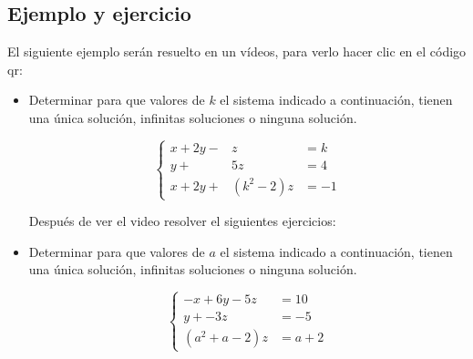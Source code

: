 \documentclass[11pt]{article}
\begin{document}
\subsection{Ejemplo y ejercicio}
El siguiente ejemplo serán resuelto en un  vídeos, para verlo hacer clic en el código qr: 


\begin{itemize}
    \item[Ejemplo:]  Determinar para que valores de $k$ el  sistema indicado a continuación, tienen una única solución, infinitas soluciones o ninguna solución.

\[
\left\{
\begin{array}{rcl}
 x+ 2y -&\!\! z    & = k\\
 y +&\!\!  5z    & = 4 \\
 x + 2 y +&\!\! (k^2 -2) z & = -1
\end{array}
\right.
\] 



  \begin{center}
    

\end{center}


Después de ver el video resolver el siguientes ejercicios:  






\item[Ejercicio:]Determinar para que valores de $a$ el  sistema indicado a continuación, tienen una única solución, infinitas soluciones o ninguna solución.

\[
\left\{
\begin{array}{rl}
 -x + 6y -5 z & = 10\\
 y +-3 z    & = -5 \\
 (a^2+a-2) z & =a+2
\end{array}
\right.
\] 


\end{itemize} 
\end{document}
